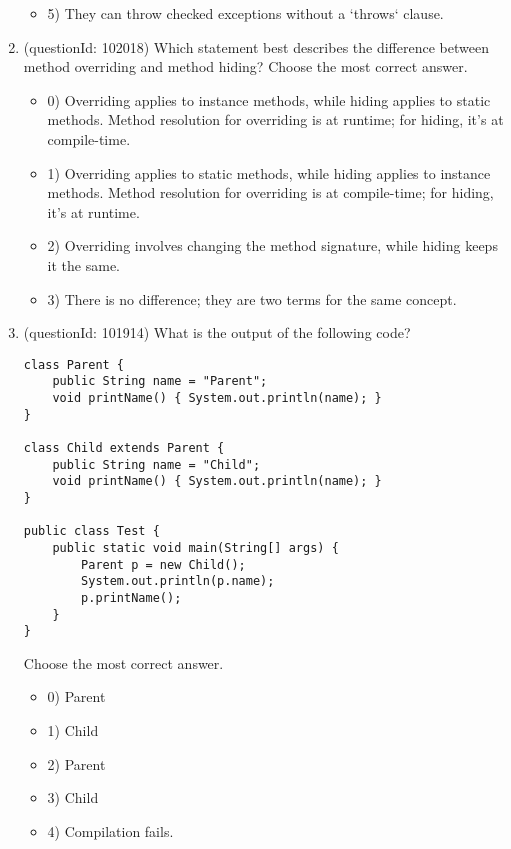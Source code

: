 \documentclass[12pt]{article}
\begin{document}
\begin{enumerate}[label=(\arabic*)]
\begin{itemize}
\item 5) They can throw checked exceptions without a `throws` clause.

\end{itemize}
\item (questionId: 102018) Which statement best describes the difference between method overriding and method hiding?
Choose the most correct answer. 
\begin{itemize}
\item 0) Overriding applies to instance methods, while hiding applies to static methods. Method resolution for overriding is at runtime; for hiding, it's at compile-time.

\item 1) Overriding applies to static methods, while hiding applies to instance methods. Method resolution for overriding is at compile-time; for hiding, it's at runtime.

\item 2) Overriding involves changing the method signature, while hiding keeps it the same.

\item 3) There is no difference; they are two terms for the same concept.

\end{itemize}
\item (questionId: 101914) What is the output of the following code?
\begin{verbatim}
class Parent {
    public String name = "Parent";
    void printName() { System.out.println(name); }
}

class Child extends Parent {
    public String name = "Child";
    void printName() { System.out.println(name); }
}

public class Test {
    public static void main(String[] args) {
        Parent p = new Child();
        System.out.println(p.name);
        p.printName();
    }
}
\end{verbatim}
Choose the most correct answer. 
\begin{itemize}
\item 0) Parent\nChild

\item 1) Child\nChild

\item 2) Parent\nParent

\item 3) Child\nParent

\item 4) Compilation fails.


\end{itemize}
\end{enumerate}
\end{document}
